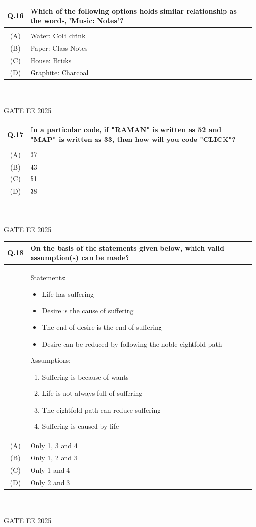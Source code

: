 \documentclass[journal,12pt,onecolumn]{IEEEtran}
\theoremstyle{remark}
\begin{document}
\begin{tabular}{|c|p{16cm}|}\hline
   Q.16 & Which of the following options holds similar relationship as the words, 'Music: Notes'?  \\   \hline
     & \\    \hline
 (A) & Water: Cold drink \\
\hline
(B) & Paper: Class Notes \\
\hline
(C) & House: Bricks \\
\hline
(D) & Graphite: Charcoal \\
\hline
\end{tabular} ~\\ \\
GATE EE 2025\\

\begin{tabular}{|c|p{16cm}|}\hline
   Q.17 & In a particular code, if "RAMAN" is written as 52 and "MAP" is written as 33, then how will you code "CLICK"?  \\   \hline
     & \\    \hline
 (A) & 37 \\
\hline
(B) & 43 \\
\hline
(C) & 51 \\
\hline
(D) & 38 \\
\hline
\end{tabular} ~\\ \\
GATE EE 2025\\

\begin{tabular}{|c|p{16cm}|}\hline
   Q.18 & On the basis of the statements given below, which valid assumption(s) can be
made? \\   \hline
     & Statements:
\begin{itemize}
    \item Life has suffering
    \item Desire is the cause of suffering
    \item The end of desire is the end of suffering
    \item Desire can be reduced by following the noble eightfold path
\end{itemize}
Assumptions:
\begin{enumerate}
    \item Suffering is because of wants
    \item Life is not always full of suffering
    \item The eightfold path can reduce suffering
    \item Suffering is caused by life
\end{enumerate} \\    \hline
  (A) & Only 1, 3 and 4 \\
\hline
(B) & Only 1, 2 and 3 \\
\hline
(C) & Only 1 and 4 \\
\hline
(D) & Only 2 and 3 \\
\hline
\end{tabular} ~\\ \\
GATE EE 2025\\
\end{document}
